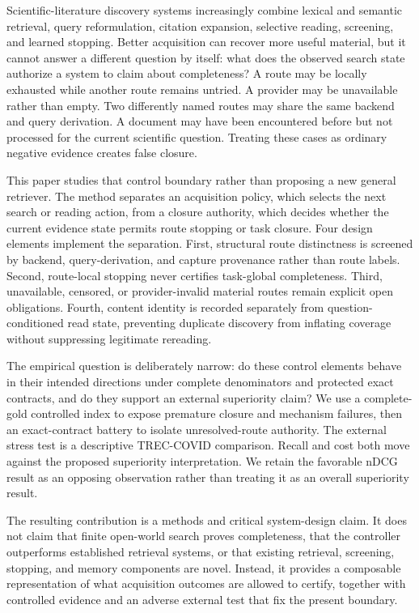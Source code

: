 \documentclass[a4paper,fleqn]{cas-sc}
\theoremstyle{definition}
\begin{document}
Scientific-literature discovery systems increasingly combine lexical and
semantic retrieval, query reformulation, citation expansion, selective reading,
screening, and learned stopping. Better acquisition can recover more useful
material, but it cannot answer a different question by itself: what does the
observed search state authorize a system to claim about completeness? A route
may be locally exhausted while another route remains untried. A provider may be
unavailable rather than empty. Two differently named routes may share the same
backend and query derivation. A document may have been encountered before but
not processed for the current scientific question. Treating these cases as
ordinary negative evidence creates false closure.

This paper studies that control boundary rather than proposing a new general
retriever. The method separates an acquisition policy, which selects the next
search or reading action, from a closure authority, which decides whether the
current evidence state permits route stopping or task closure. Four design
elements implement the separation. First, structural route distinctness is screened by
backend, query-derivation, and capture provenance rather than route labels.
Second, route-local stopping never certifies task-global completeness. Third,
unavailable, censored, or provider-invalid material routes remain explicit open
obligations. Fourth, content identity is recorded separately from
question-conditioned read state, preventing duplicate discovery from inflating
coverage without suppressing legitimate rereading.

The empirical question is deliberately narrow: do these control elements
behave in their intended directions under complete denominators and protected
exact contracts, and do they support an external superiority claim? We use a
complete-gold controlled index to expose premature closure and mechanism
failures, then an exact-contract battery to isolate unresolved-route authority.
The external stress test is a descriptive TREC-COVID comparison. Recall and
cost both move against the proposed superiority interpretation. We retain the
favorable nDCG result as an opposing observation rather than treating it as an
overall superiority result.

The resulting contribution is a methods and critical system-design claim. It
does not claim that finite open-world search proves completeness, that the
controller outperforms established retrieval systems, or that existing
retrieval, screening, stopping, and memory components are novel. Instead, it
provides a composable representation of what acquisition outcomes are allowed
to certify, together with controlled evidence and an adverse external test that
fix the present boundary.
\end{document}
